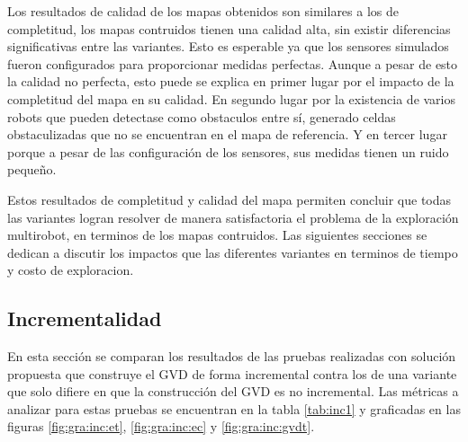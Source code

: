 Los resultados de calidad de los mapas obtenidos son similares a los de
completitud, los mapas contruidos tienen una calidad alta, sin existir
diferencias significativas entre las variantes. Esto es esperable ya que
los sensores simulados fueron configurados para proporcionar medidas perfectas.
Aunque a pesar de esto la calidad no perfecta, esto puede se explica en primer
lugar por el impacto de la completitud del mapa en su calidad. En segundo lugar
por la existencia de varios robots que pueden detectase como obstaculos entre
sí, generado celdas obstaculizadas que no se encuentran en el mapa de
referencia. Y en tercer lugar porque a pesar de las configuración de los
sensores, sus medidas tienen un ruido pequeño.

Estos resultados de completitud y calidad del mapa permiten concluir que todas
las variantes logran resolver de manera satisfactoria el problema de la
exploración multirobot, en terminos de los mapas contruidos. Las
siguientes secciones se dedican a discutir los impactos que las diferentes
variantes en terminos de tiempo y costo de exploracion.









\subsection{Incrementalidad}\label{sec:exp:inc}
En esta sección se comparan los resultados de las pruebas realizadas con
solución propuesta que construye el GVD de forma incremental contra los de una
variante que solo difiere en que la construcción del GVD es no incremental. Las
métricas a analizar para estas pruebas se encuentran en la tabla \ref{tab:inc1}
y graficadas en las figuras \ref{fig:gra:inc:et}, \ref{fig:gra:inc:ec} y
\ref{fig:gra:inc:gvdt}.

